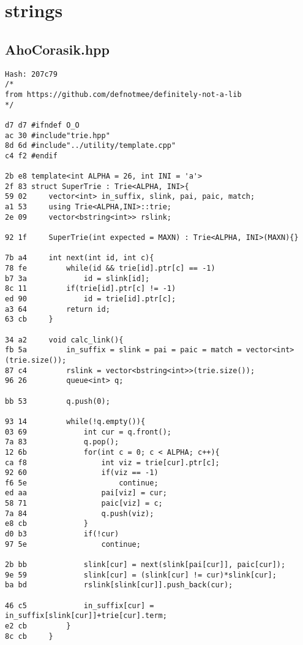 \documentclass[11pt, a4paper, twoside]{article}
\begin{document}
%
%

\section{strings}

\subsection{AhoCorasik.hpp}
\begin{lstlisting}
Hash: 207c79
/*
from https://github.com/defnotmee/definitely-not-a-lib
*/

d7 d7 #ifndef O_O
ac 30 #include"trie.hpp"
8d 6d #include"../utility/template.cpp"
c4 f2 #endif

2b e8 template<int ALPHA = 26, int INI = 'a'>
2f 83 struct SuperTrie : Trie<ALPHA, INI>{
59 02     vector<int> in_suffix, slink, pai, paic, match;
a1 53     using Trie<ALPHA,INI>::trie;
2e 09     vector<bstring<int>> rslink;
      
92 1f     SuperTrie(int expected = MAXN) : Trie<ALPHA, INI>(MAXN){}
      
7b a4     int next(int id, int c){
78 fe         while(id && trie[id].ptr[c] == -1)
b7 3a             id = slink[id];
8c 11         if(trie[id].ptr[c] != -1)
ed 90             id = trie[id].ptr[c];
a3 64         return id;
63 cb     }
      
34 a2     void calc_link(){
fb 5a         in_suffix = slink = pai = paic = match = vector<int>(trie.size());
87 c4         rslink = vector<bstring<int>>(trie.size());
96 26         queue<int> q;
      
bb 53         q.push(0);
      
93 14         while(!q.empty()){
03 69             int cur = q.front();
7a 83             q.pop();
12 6b             for(int c = 0; c < ALPHA; c++){
ca f8                 int viz = trie[cur].ptr[c];
92 60                 if(viz == -1)
f6 5e                     continue;
ed aa                 pai[viz] = cur;
58 71                 paic[viz] = c;
7a 84                 q.push(viz);
e8 cb             }
d0 b3             if(!cur)
97 5e                 continue;
      
2b bb             slink[cur] = next(slink[pai[cur]], paic[cur]);
9e 59             slink[cur] = (slink[cur] != cur)*slink[cur];
ba bd             rslink[slink[cur]].push_back(cur);
      
46 c5             in_suffix[cur] = in_suffix[slink[cur]]+trie[cur].term;
e2 cb         }
8c cb     }
      

\end{lstlisting}
\end{document}
